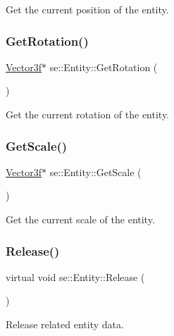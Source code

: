 Get the current position of the entity. \mbox{\label{classse_1_1_entity_a52f05222018d86a064cbc2f5c95da203}} 
\subsubsection{\texorpdfstring{Get\+Rotation()}{GetRotation()}}
{\footnotesize\ttfamily \mbox{\hyperlink{namespacese_a12e07512d95e2fdebdaf74a5ea2cf5f6}{Vector3f}}$\ast$ se\+::\+Entity\+::\+Get\+Rotation (\begin{DoxyParamCaption}{ }\end{DoxyParamCaption})}

Get the current rotation of the entity. \mbox{\label{classse_1_1_entity_a1ef3f16cc61246c13d4c3f94169c4f44}} 
\subsubsection{\texorpdfstring{Get\+Scale()}{GetScale()}}
{\footnotesize\ttfamily \mbox{\hyperlink{namespacese_a12e07512d95e2fdebdaf74a5ea2cf5f6}{Vector3f}}$\ast$ se\+::\+Entity\+::\+Get\+Scale (\begin{DoxyParamCaption}{ }\end{DoxyParamCaption})}

Get the current scale of the entity. \mbox{\label{classse_1_1_entity_aac1c64a40d796cfda308aaa88214bf1c}} 
\subsubsection{\texorpdfstring{Release()}{Release()}}
{\footnotesize\ttfamily virtual void se\+::\+Entity\+::\+Release (\begin{DoxyParamCaption}{ }\end{DoxyParamCaption})\hspace{0.3cm}{\ttfamily [virtual]}}

Release related entity data. \mbox{\label{classse_1_1_entity_a4fcf5639a2e6e74e0b12893e70a46a83}} 
